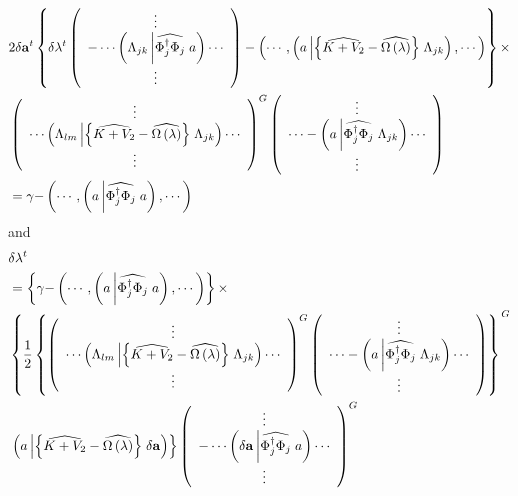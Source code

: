 \documentclass[aps,preprint]{revtex4}%
\begin{document}
\begin{align}
&  2\delta\mathbf{a}^{t}\left\{  \delta\mathbf{\lambda}^{t}\left(
\begin{array}
[c]{c}%
\vdots\\
-\cdots\left(  \Lambda_{jk}\left\vert \widehat{\Phi_{j}^{\dagger}\Phi_{j}%
}\right.  a\right)  \cdots\\
\vdots
\end{array}
\right)  -\left(  \cdots,\left(  a\left\vert \left\{  \widehat{K+V_{2}%
}-\widehat{\Omega\left(  \lambda\right)  }\right\}  \right.  \Lambda
_{jk}\right)  ,\cdots\right)  \right\}  \times\nonumber\\
&  \left(
\begin{array}
[c]{c}%
\vdots\\
\cdots\left(  \Lambda_{lm}\left\vert \left\{  \widehat{K+V_{2}}%
-\widehat{\Omega\left(  \lambda\right)  }\right\}  \right.  \Lambda
_{jk}\right)  \cdots\\
\vdots
\end{array}
\right)  ^{G}\left(
\begin{array}
[c]{c}%
\vdots\\
\cdots-\left(  a\left\vert \widehat{\Phi_{j}^{\dagger}\Phi_{j}}\right.
\Lambda_{jk}\right)  \cdots\\
\vdots
\end{array}
\right) \nonumber\\
&  =\mathbf{\gamma-}\left(  \cdots,\left(  a\left\vert \widehat{\Phi
_{j}^{\dagger}\Phi_{j}}\right.  a\right)  ,\cdots\right)
\end{align}
and
\begin{align}
&  \delta\mathbf{\lambda}^{t}\nonumber\\
&  =\left\{  \mathbf{\gamma-}\left(  \cdots,\left(  a\left\vert \widehat{\Phi
_{j}^{\dagger}\Phi_{j}}\right.  a\right)  ,\cdots\right)  \right\}
\times\nonumber\\
&  \left\{  \frac{1}{2}\left\{  \left(
\begin{array}
[c]{c}%
\vdots\\
\cdots\left(  \Lambda_{lm}\left\vert \left\{  \widehat{K+V_{2}}%
-\widehat{\Omega\left(  \lambda\right)  }\right\}  \right.  \Lambda
_{jk}\right)  \cdots\\
\vdots
\end{array}
\right)  ^{G}\left(
\begin{array}
[c]{c}%
\vdots\\
\cdots-\left(  a\left\vert \widehat{\Phi_{j}^{\dagger}\Phi_{j}}\right.
\Lambda_{jk}\right)  \cdots\\
\vdots
\end{array}
\right)  \right\}  \right.  ^{G}\nonumber\\
&  \left.  \left(  a\left\vert \left\{  \widehat{K+V_{2}}-\widehat{\Omega
\left(  \lambda\right)  }\right\}  \right.  \delta\mathbf{a}\right)  \right\}
\left(
\begin{array}
[c]{c}%
\vdots\\
-\cdots\left(  \delta\mathbf{a}\left\vert \widehat{\Phi_{j}^{\dagger}\Phi_{j}%
}\right.  a\right)  \cdots\\
\vdots
\end{array}
\right)  ^{G}%
\end{align}
\end{document}
